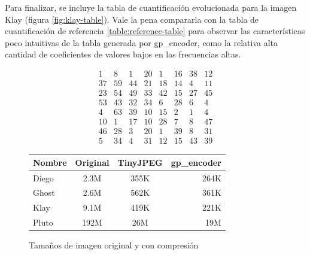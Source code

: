 Para finalizar, se incluye la tabla de cuantificación evolucionada para la
imagen Klay (figura \ref{fig:klay-table}). Vale la pena compararla con la tabla de
cuantificación de referencia \ref{table:reference-table} para observar las
características poco intuitivas de la tabla generada por gp\_encoder, como la
relativa alta cantidad de coeficientes de valores bajos en las frecuencias
altas.


\begin{equation}
    \begin{matrix}
        1  &   8  &  1  & 20  &  1  & 16  & 38  & 12 \\
        37 &   59 &  44 &  21 &  18 &  14 &   4 &  11 \\
        23 &   54 &  49 &  33 &  42 &  15 &  27 &  45 \\
        53 &   43 &  32 &  34 &   6 &  28 &   6 &   4 \\
        4  &  63  & 39  & 10  & 15  &  2  &  1  &  4 \\
        10 &    1 &  17 &  10 &  28 &   7 &   8 &  47 \\
        46 &   28 &   3 &  20 &   1 &  39 &   8 &  31 \\
        5  &  34  &  4  & 31  & 12  & 15  & 43  & 39
    \end{matrix}
    \label{fig:klay-table}
\end{equation}

\begin{figure}[h]
    \begin{tabular}{|l c c r|}
        \hline
        Nombre & Original & TinyJPEG & gp\_encoder \\
        \hline
        Diego & 2.3M & 355K & 264K \\
        Ghost & 2.6M & 562K & 361K \\
        Klay  & 9.1M & 419K & 221K \\
        Pluto & 192M & 26M  & 19M  \\
        \hline
    \end{tabular}
    \caption{Tamaños de imagen original y con compresión}
    \label{fig:size-table}
\end{figure}


